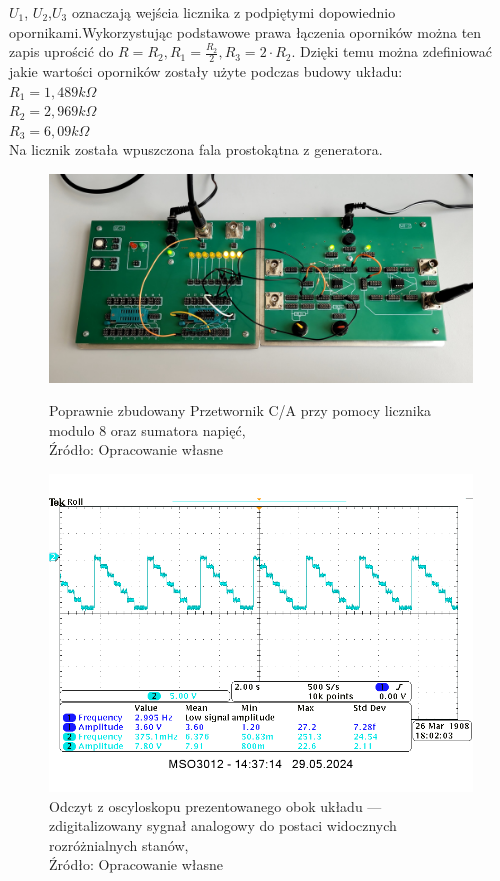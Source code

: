 \documentclass{article}
\begin{document}
      $U_1$, $U_2$,$U_3$ oznaczają wejścia licznika z podpiętymi dopowiednio opornikami.Wykorzystując podstawowe prawa łączenia oporników można ten zapis uprościć do $R = R_2, R_1 = \frac{R_2}{2}, R_3 = 2 \cdot R_2$. Dzięki temu można zdefiniować jakie wartości oporników zostały użyte podczas budowy układu: \\
      $R_1 = 1,489 k \Omega$ \\
      $R_2 = 2,969 k \Omega$ \\
      $R_3 = 6,09 k \Omega$ \\
      Na licznik została wpuszczona fala prostokątna z generatora.
      \begin{figure}[!ht]
        \begin{minipage}{.5\textwidth}
          \centering
          \includegraphics[scale=0.06]{grafiki/6.2_zdj.jpg}
          \caption{Poprawnie zbudowany Przetwornik C/A przy pomocy licznika modulo 8 oraz sumatora napięć,
          \\Źródło: Opracowanie własne}
        \end{minipage}
        \begin{minipage}{.5\textwidth}
          \centering
          \includegraphics[scale=0.35]{grafiki/schodki.png}
          \caption{Odczyt z oscyloskopu prezentowanego obok układu --- zdigitalizowany sygnał analogowy do postaci widocznych rozróżnialnych stanów,
          \\Źródło: Opracowanie własne}
        \end{minipage}
      \end{figure}
      \pagebreak
      
\end{document}
